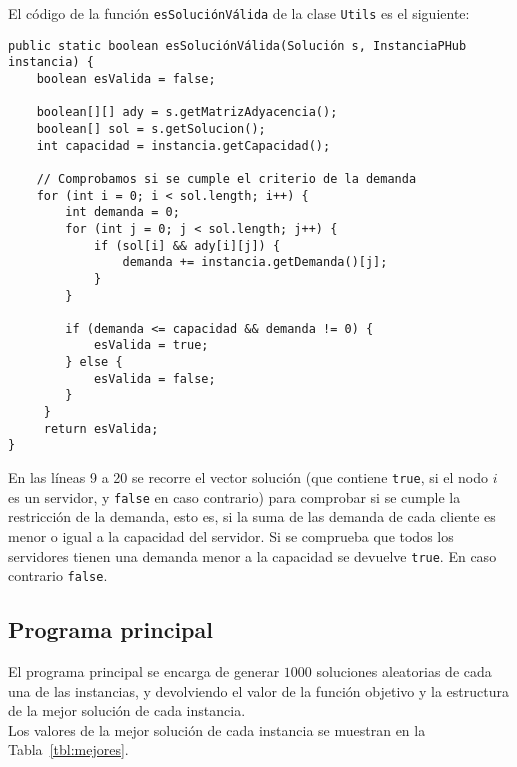 \documentclass[11pt,a4paper,twoside,openright,titlepage,final]{article}
\begin{document}
El código de la función \texttt{esSoluciónVálida} de la clase \texttt{Utils} es el siguiente:

\begin{verbatim}
public static boolean esSoluciónVálida(Solución s, InstanciaPHub instancia) {
    boolean esValida = false;

    boolean[][] ady = s.getMatrizAdyacencia();
    boolean[] sol = s.getSolucion();
    int capacidad = instancia.getCapacidad();

    // Comprobamos si se cumple el criterio de la demanda
    for (int i = 0; i < sol.length; i++) {
        int demanda = 0;
        for (int j = 0; j < sol.length; j++) {
            if (sol[i] && ady[i][j]) {
                demanda += instancia.getDemanda()[j];
            }
        }

        if (demanda <= capacidad && demanda != 0) {
            esValida = true;
        } else {
	        esValida = false;
        }
     }
     return esValida;
}
\end{verbatim}

En las líneas 9 a 20 se recorre el vector solución (que contiene \texttt{true}, si el nodo $i$ es un servidor, y \texttt{false} en caso contrario) para comprobar si se cumple la restricción de la demanda, esto es, si la suma de las demanda de cada cliente es menor o igual a la capacidad del servidor. Si se comprueba que todos los servidores tienen una demanda menor a la capacidad se devuelve \texttt{true}. En caso contrario \texttt{false}.

\subsection{Programa principal}

El programa principal se encarga de generar $1000$ soluciones aleatorias de cada una de las instancias, y devolviendo el valor de la función objetivo y la estructura de la mejor solución de cada instancia.\\

Los valores de la mejor solución de cada instancia se muestran en la Tabla~\ref{tbl:mejores}.\\
\end{document}
